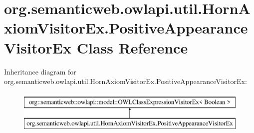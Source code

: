 \hypertarget{classorg_1_1semanticweb_1_1owlapi_1_1util_1_1_horn_axiom_visitor_ex_1_1_positive_appearance_visitor_ex}{\section{org.\-semanticweb.\-owlapi.\-util.\-Horn\-Axiom\-Visitor\-Ex.\-Positive\-Appearance\-Visitor\-Ex Class Reference}
\label{classorg_1_1semanticweb_1_1owlapi_1_1util_1_1_horn_axiom_visitor_ex_1_1_positive_appearance_visitor_ex}
}
Inheritance diagram for org.\-semanticweb.\-owlapi.\-util.\-Horn\-Axiom\-Visitor\-Ex.\-Positive\-Appearance\-Visitor\-Ex\-:\begin{figure}[H]
\begin{center}
\leavevmode
\includegraphics[height=2.000000cm]{classorg_1_1semanticweb_1_1owlapi_1_1util_1_1_horn_axiom_visitor_ex_1_1_positive_appearance_visitor_ex}
\end{center}
\end{figure}
